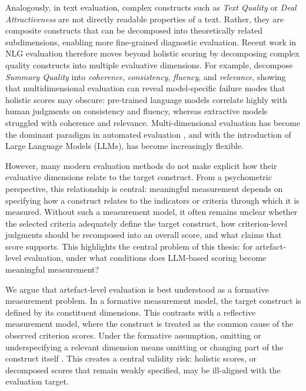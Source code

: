 Analogously, in text evaluation, complex constructs such as \textit{Text Quality} or \textit{Deal Attractiveness} are not directly readable properties of a text. Rather, they are composite constructs that can be decomposed into theoretically related subdimensions, enabling more fine-grained diagnostic evaluation. Recent work in NLG evaluation therefore moves beyond holistic scoring by decomposing complex quality constructs into multiple evaluative dimensions. For example, \citet{fabbri_summeval_2021} decompose \textit{Summary Quality} into \textit{coherence}, \textit{consistency}, \textit{fluency}, and \textit{relevance}, showing that multidimensional evaluation can reveal model-specific failure modes that holistic scores may obscure: pre-trained language models correlate highly with human judgments on consistency and fluency, whereas extractive models struggled with coherence and relevance. Multi-dimensional evaluation has become the dominant paradigm in automated evaluation \citep{zhongUnifiedMultiDimensionalEvaluator2022a}, and with the introduction of Large Language Models (LLMs), has become increasingly flexible. 

However, many modern evaluation methods do not make explicit how their evaluative dimensions relate to the target construct. From a psychometric perspective, this relationship is central: meaningful measurement depends on specifying how a construct relates to the indicators or criteria through which it is measured. Without such a measurement model, it often remains unclear whether the selected criteria adequately define the target construct, how criterion-level judgments should be recomposed into an overall score, and what claims that score supports. This highlights the central problem of this thesis: for artefact-level evaluation, under what conditions does LLM-based scoring become meaningful measurement?

We argue that artefact-level evaluation is best understood as a formative measurement problem. In a formative measurement model, the target construct is defined by its constituent dimensions. This contrasts with a reflective measurement model, where the construct is treated as the common cause of the observed criterion scores. Under the formative assumption, omitting or underspecifying a relevant dimension means omitting or changing part of the construct itself \citep{bollen1991conventional}. This creates a central validity risk: holistic scores, or decomposed scores that remain weakly specified, may be ill-aligned with the evaluation target.


